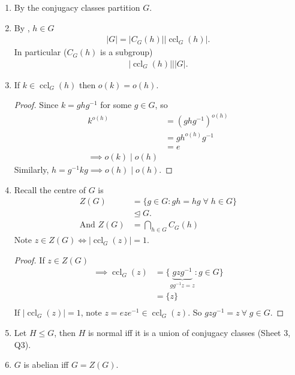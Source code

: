 \begin{remark} \mbox{}
    \begin{enumerate}
        \item By  the conjugacy classes partition $G$.
        \item By , $h \in G$
        \begin{align*}
            |G| = |C_G(h)| |\operatorname{ccl}_G(h)|.
        \end{align*} 
        In particular ($C_G(h)$ is a subgroup)
        \begin{align*}
            |\operatorname{ccl}_G(h)| \bigg| |G|.
        \end{align*} 
        \item If $k \in \operatorname{ccl}_G(h)$ then $o(k) = o(h)$.
        \begin{proof}
            Since $k = ghg^{-1}$ for some $g \in G$, so
        \begin{align*}
            k^{o(h)} &= (ghg^{-1})^{o(h)} \\
            &= g h^{o(h)} g^{-1} \\
            &= e \\
            \implies o(k) \mid o(h)
        \end{align*} 
        Similarly, $h = g^{-1} k g \implies o(h) \mid o(h)$.
        \end{proof} 
        \item \label{conjugacy-4}
        Recall the centre of $G$ is
        \begin{align*}
            Z(G) &= \{g \in G : gh = hg \; \forall \; h \in G\} \\
            &\trianglelefteq G. \\
            \text{And } Z(G) &= \bigcap_{h \in G} C_G(h)
        \end{align*} 
        Note $z \in Z(G) \iff |\operatorname{ccl}_G(z)| = 1$.
        \begin{proof}
            If $z \in Z(G)$
            \begin{align*}
                \implies \operatorname{ccl}_G(z) &= \{ \underbrace{gzg^{-1}}_{gg^{-1} z = z} : g \in G\} \\
                &= \{z\} \\
            \end{align*} 
            If $|\operatorname{ccl}_G(z)| = 1$, note $z = e z e^{-1} \in \operatorname{ccl}_G(z)$.
            So $gzg^{-1} = z \ \forall \; g \in G$.
        \end{proof} 
        \item Let $H \leq G$, then $H$ is normal iff it is a union of conjugacy classes (Sheet 3, Q3).
        \item $G$ is abelian iff $G = Z(G)$.
    \end{enumerate} 
\end{remark} 

